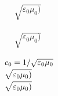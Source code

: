 \documentclass[]{article}
\begin{document}
	
\scriptsize
    	\begin{minipage}[t]{0.333\textwidth}
    	
    	\begin{align*}
    		\sqrt{\varepsilon_0 \mu_0)}
    	\end{align*}	
    	
    	\end{minipage}
    	\begin{minipage}[t]{0.333\textwidth}
    	\begin{align*}
    		\sqrt{\varepsilon_0 \mu_0)}
    	\end{align*}
    	\end{minipage}
    	\begin{minipage}[t]{0.333\textwidth}

	\begin{align*}
		 & ~\smash{c_0 = 1/\sqrt{\varepsilon_0 \mu_0}} \\
		 & ~\smash{\sqrt{\varepsilon_0 \mu_0)}}         \\
		 & ~\smash{\sqrt{\varepsilon_0 \mu_0)}}
	\end{align*}	

	\end{minipage}
    	
\end{document}
